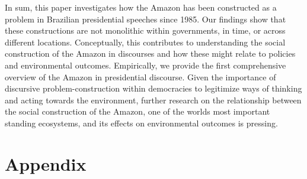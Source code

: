 \documentclass[
]{article}
\begin{document}
In sum, this paper investigates how the Amazon has been constructed as a
problem in Brazilian presidential speeches since 1985. Our findings show
that these constructions are not monolithic within governments, in time,
or across different locations. Conceptually, this contributes to
understanding the social construction of the Amazon in discourses and
how these might relate to policies and environmental outcomes.
Empirically, we provide the first comprehensive overview of the Amazon
in presidential discourse. Given the importance of discursive
problem-construction within democracies to legitimize ways of thinking
and acting towards the environment, further research on the relationship
between the social construction of the Amazon, one of the worlds most
important standing ecosystems, and its effects on environmental outcomes
is pressing.

\hypertarget{appendix}{%
\section{Appendix}\label{appendix}}
\end{document}
